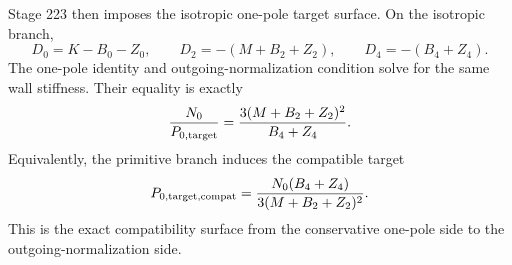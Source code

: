 Stage 223 then imposes the isotropic one-pole target surface.  On the isotropic branch,
\begin{equation}
\label{eq:part07-d-coefficients-isotropic}
D_0=K-B_0-Z_0,
\qquad
D_2=-(M+B_2+Z_2),
\qquad
D_4=-(B_4+Z_4).
\end{equation}
The one-pole identity and outgoing-normalization condition solve for the same wall stiffness.  Their equality is exactly
\begin{equation}
\label{eq:part07-compatibility-equation}
\frac{N_0}{P_{0,{\rm target}}}
=
\frac{3(M+B_2+Z_2)^2}{B_4+Z_4}.
\end{equation}
Equivalently, the primitive branch induces the compatible target
\begin{equation}
\label{eq:part07-compatible-target}
P_{0,{\rm target,compat}}
=
\frac{N_0(B_4+Z_4)}{3(M+B_2+Z_2)^2}.
\end{equation}
This is the exact compatibility surface from the conservative one-pole side to the outgoing-normalization side.

